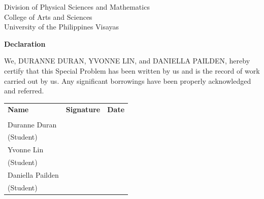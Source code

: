 
\begin{center}
Division of Physical Sciences and Mathematics\\
College of Arts and Sciences\\
University of the Philippines Visayas

\textbf{Declaration}
\end{center}

We, DURANNE DURAN, YVONNE LIN, and DANIELLA PAILDEN, hereby certify that this Special Problem has been written by us and is the record of work carried out by us. Any significant borrowings have been properly acknowledged and referred.

\begin{tabular}{lll}
\bfseries Name & \bfseries Signature & \bfseries Date\\ \\
Duranne Duran & \signaturerule & \signaturerule\\
\multicolumn{1}{l}{(Student)}\\
Yvonne Lin & \signaturerule & \signaturerule\\
\multicolumn{1}{l}{(Student)}\\
Daniella Pailden & \signaturerule & \signaturerule\\
\multicolumn{1}{l}{(Student)}
\end{tabular}